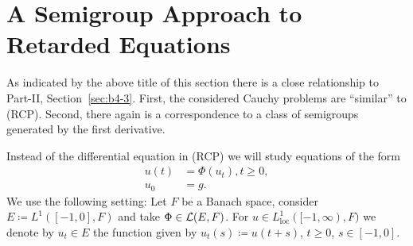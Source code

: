 \newpage
\section{A Semigroup Approach to Retarded Equations}\label{sec:c4-3}
%
%
%
\hspace{1cm}{\Large by Annette Grabosch and Ulrich Moustakas}
\vspace{.5cm}
\newline
{}
As indicated by the above title of this section there is a close relationship to Part-II, Section~\ref{sec:b4-3}.
First, the considered Cauchy problems are \enquote{similar} to (RCP).
Second, there again is a correspondence to a class of semigroups generated by the first derivative.

Instead of the differential equation in (RCP) we will study equations of the form
\begin{equation*}\label{eq:c4-re} \tag{RE}
\begin{split} 
u(t) &= \Phi(u_t),  t \geq 0,\\
u_0 &= g.
\end{split}
\end{equation*}
We use the following setting: Let $F$ be a Banach space, consider $E \coloneqq L^{1}([-1,0],F)$ and take $\Phi \in \mathcal{L}(E,F)$.
For $u \in L^{1}_{\mathrm{loc}}([-1,\infty),F)$ we denote by $u_t \in E$ the function given by $u_t(s) \coloneqq u(t+s)$, $t \geq 0$, $s \in [-1,0]$.

